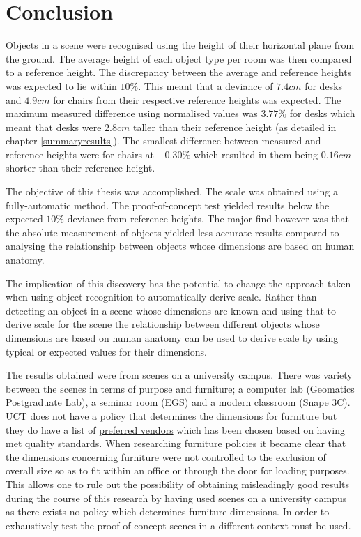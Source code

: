 
\chapter{Conclusion} %
\label{Chapter5}

Objects in a scene were recognised using the height of their horizontal plane from the ground. The average height of each object type per room was then compared to a reference height. The discrepancy between the average and reference heights was expected to lie within $10\%$. This meant that a deviance of $7.4cm$ for desks and $4.9cm$ for chairs from their respective reference heights was expected. The maximum measured difference using normalised values was $3.77\%$ for desks which meant that desks were $2.8cm$ taller than their reference height (as detailed in chapter \ref{summaryresults}). The smallest difference between measured and reference heights were for chairs at $-0.30\%$ which resulted in them being $0.16cm$ shorter than their reference height. 

The objective of this thesis was accomplished. The scale was obtained using a fully-automatic method. The proof-of-concept test yielded results below the expected $10\%$ deviance from reference heights. The major find however was that the absolute measurement of objects yielded less accurate results compared to analysing the relationship between objects whose dimensions are based on human anatomy. 

The implication of this discovery has the potential to change the approach taken when using object recognition to automatically derive scale. Rather than detecting an object in a scene whose dimensions are known and using that to derive scale for the scene the relationship between different objects whose dimensions are based on human anatomy can be used to derive scale by using typical or expected values for their dimensions. 

The results obtained were from scenes on a university campus. There was variety between the scenes in terms of purpose and furniture; a computer lab (Geomatics Postgraduate Lab), a seminar room (EGS) and a modern classroom (Snape 3C). UCT does not have a policy that determines the dimensions for furniture but they do have a list of \href{http://www.uct.ac.za/usr/finance/pps/vendors/prefvend.pdf}{preferred vendors} which has been chosen based on having met quality standards. When researching furniture policies it became clear that the dimensions concerning furniture were not controlled to the exclusion of overall size so as to fit within an office or through the door for loading purposes. This allows one to rule out the possibility of obtaining misleadingly good results during the course of this research by having used scenes on a university campus as there exists no policy which determines furniture dimensions. In order to exhaustively test the proof-of-concept scenes in a different context must be used.

